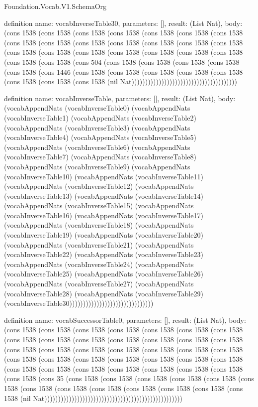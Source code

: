 \begin{lexlean}{Foundation.Vocab.V1.SchemaOrg}
\begin{semanticmodule}
definition{
  name: vocabInverseTable30,
  parameters: [],
  result: (List Nat),
  body: (cons 1538 (cons 1538 (cons 1538 (cons 1538 (cons 1538 (cons 1538 (cons 1538 (cons 1538 (cons 1538 (cons 1538 (cons 1538 (cons 1538 (cons 1538 (cons 1538 (cons 1538 (cons 1538 (cons 1538 (cons 1538 (cons 1538 (cons 1538 (cons 1538 (cons 1538 (cons 1538 (cons 504 (cons 1538 (cons 1538 (cons 1538 (cons 1538 (cons 1538 (cons 1446 (cons 1538 (cons 1538 (cons 1538 (cons 1538 (cons 1538 (cons 1538 (cons 1538 (cons 1538 (nil Nat)))))))))))))))))))))))))))))))))))))))
}

definition{
  name: vocabInverseTable,
  parameters: [],
  result: (List Nat),
  body: (vocabAppendNats (vocabInverseTable0) (vocabAppendNats (vocabInverseTable1) (vocabAppendNats (vocabInverseTable2) (vocabAppendNats (vocabInverseTable3) (vocabAppendNats (vocabInverseTable4) (vocabAppendNats (vocabInverseTable5) (vocabAppendNats (vocabInverseTable6) (vocabAppendNats (vocabInverseTable7) (vocabAppendNats (vocabInverseTable8) (vocabAppendNats (vocabInverseTable9) (vocabAppendNats (vocabInverseTable10) (vocabAppendNats (vocabInverseTable11) (vocabAppendNats (vocabInverseTable12) (vocabAppendNats (vocabInverseTable13) (vocabAppendNats (vocabInverseTable14) (vocabAppendNats (vocabInverseTable15) (vocabAppendNats (vocabInverseTable16) (vocabAppendNats (vocabInverseTable17) (vocabAppendNats (vocabInverseTable18) (vocabAppendNats (vocabInverseTable19) (vocabAppendNats (vocabInverseTable20) (vocabAppendNats (vocabInverseTable21) (vocabAppendNats (vocabInverseTable22) (vocabAppendNats (vocabInverseTable23) (vocabAppendNats (vocabInverseTable24) (vocabAppendNats (vocabInverseTable25) (vocabAppendNats (vocabInverseTable26) (vocabAppendNats (vocabInverseTable27) (vocabAppendNats (vocabInverseTable28) (vocabAppendNats (vocabInverseTable29) (vocabInverseTable30)))))))))))))))))))))))))))))))
}

definition{
  name: vocabSuccessorTable0,
  parameters: [],
  result: (List Nat),
  body: (cons 1538 (cons 1538 (cons 1538 (cons 1538 (cons 1538 (cons 1538 (cons 1538 (cons 1538 (cons 1538 (cons 1538 (cons 1538 (cons 1538 (cons 1538 (cons 1538 (cons 1538 (cons 1538 (cons 1538 (cons 1538 (cons 1538 (cons 1538 (cons 1538 (cons 1538 (cons 1538 (cons 1538 (cons 1538 (cons 1538 (cons 1538 (cons 1538 (cons 1538 (cons 1538 (cons 1538 (cons 1538 (cons 1538 (cons 1538 (cons 1538 (cons 1538 (cons 35 (cons 1538 (cons 1538 (cons 1538 (cons 1538 (cons 1538 (cons 1538 (cons 1538 (cons 1538 (cons 1538 (cons 1538 (cons 1538 (cons 1538 (cons 1538 (nil Nat)))))))))))))))))))))))))))))))))))))))))))))))))))
}


\end{semanticmodule}
\end{lexlean}
